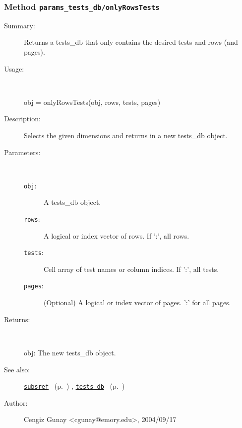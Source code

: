 \subsubsection[Method \texttt{onlyRowsTests}]{Method \texttt{params\_tests\_db/onlyRowsTests}}%
%
\label{ref_params_tests_db__onlyRowsTests}%
\hypertarget{ref_params_tests_db__onlyRowsTests}{}%
\begin{description}
\item[Summary:]Returns a tests\_db that only contains the desired 
		tests and rows (and pages).
%
\item[Usage:]~%
\begin{lyxcode}%
obj = onlyRowsTests(obj, rows, tests, pages)
%
\end{lyxcode}%
%
\item[Description:]%
Selects the given dimensions and returns in a new tests\_db object.
\item[Parameters:]~
\begin{description}%
\item[\texttt{obj}:]
 A tests\_db object.
\item[\texttt{rows}:]
 A logical or index vector of rows. If ':', all rows.
\item[\texttt{tests}:]
 Cell array of test names or column indices. If ':', all tests.
\item[\texttt{pages}:]
 (Optional) A logical or index vector of pages. ':' for all pages.
\end{description}%
%
\item[Returns:]~

	obj: The new tests\_db object.
%
%
\item[See also:]%
\hyperlink{ref_subsref}{\texttt{subsref}}%
\ (p.~\pageref{ref_subsref})%
%
, \hyperlink{ref_tests_db}{\texttt{tests\_db}}%
\ (p.~\pageref{ref_tests_db})%
%
%
\item[Author:]%
Cengiz Gunay <cgunay@emory.edu>, 2004/09/17%
\end{description}
\methodline%
